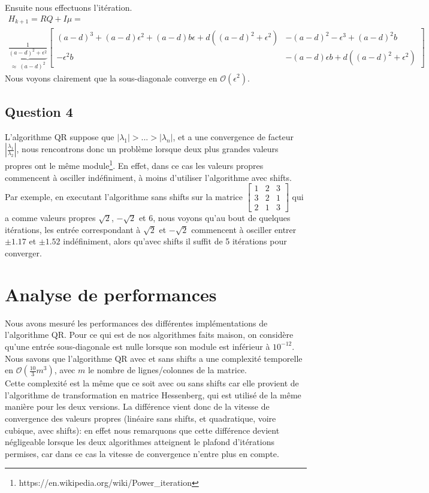 \documentclass[11pt]{article}
\begin{document}
Ensuite nous effectuons l'itération.
\begin{align*}
	H_{k+1} = RQ + I\mu =~~~~~~~~~~~~~~~~~~~~~~~~~~~~~~~~~~~~~~~~~~\\ \underbrace{\frac{1}{(a-d)^2+\epsilon^2}}_{\approx ~(a-d)^2}
	\left[
		\begin{array}{cc}
			(a-d)^3+(a-d)\epsilon^2+(a-d)b\epsilon + d((a-d)^2+\epsilon^2) & -(a-d)^2-\epsilon^3+(a-d)^2b\\
			-\epsilon^2b & -(a-d)\epsilon b + d((a-d)^2+\epsilon^2)
		\end{array}
	\right]
\end{align*}
Nous voyons clairement que la sous-diagonale converge en $\mathcal{O}(\epsilon^2)$.

\subsection*{Question 4}
L'algorithme QR suppose que $|\lambda_1| > ... > |\lambda_n|$, et a une convergence de facteur $\left|\frac{\lambda_{1}}{\lambda_2}\right|$, nous rencontrons donc un problème lorsque deux plus grandes valeurs propres ont le même module\footnote{https://en.wikipedia.org/wiki/Power\_iteration}. En effet, dans ce cas les valeurs propres commencent à osciller indéfiniment, à moins d'utiliser l'algorithme avec shifts.\\
Par exemple, en executant l'algorithme sans shifts sur la matrice $\left[\begin{array}{ccc}
	1 & 2 & 3\\ 3 & 2 & 1\\ 2 & 1 & 3
\end{array}\right]$ qui a comme valeurs propres $\sqrt{2}$, $-\sqrt{2}$ et $6$, nous voyons qu'au bout de quelques itérations, les entrée correspondant à $\sqrt{2}$ et $-\sqrt{2}$ commencent à osciller entrer $\pm1.17$ et $\pm1.52$ indéfiniment, alors qu'avec shifts il suffit de 5 itérations pour converger.

\section*{Analyse de performances}

Nous avons mesuré les performances des différentes implémentations de l'algorithme QR. Pour ce qui est de nos algorithmes faits maison, on considère qu'une entrée sous-diagonale est nulle lorsque son module est inférieur à $10^{-12}$.\\
Nous savons que l'algorithme QR avec et sans shifts a une complexité temporelle en $\mathcal{O}(\frac{10}{3}m^3)$, avec $m$ le nombre de lignes/colonnes de la matrice.\\
Cette complexité est la même que ce soit avec ou sans shifts car elle provient de l'algorithme de transformation en matrice Hessenberg, qui est utilisé de la même manière pour les deux versions. La différence vient donc de la vitesse de convergence des valeurs propres (linéaire sans shifts, et quadratique, voire cubique, avec shifts): en effet nous remarquons que cette différence devient négligeable lorsque les deux algorithmes atteignent le plafond d'itérations permises, car dans ce cas la vitesse de convergence n'entre plus en compte.

\begin{figure}[H]
	
	
	
	
\end{figure}
\end{document}
